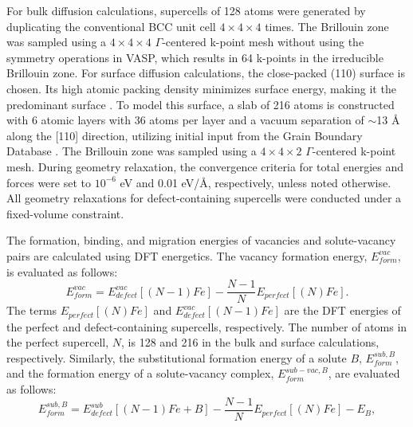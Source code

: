 \documentclass[preprint,12pt]{elsarticle}
\begin{document}
For bulk diffusion calculations, supercells of 128 atoms were generated by duplicating the conventional BCC unit cell $4\times4\times4$ times.  The Brillouin zone was sampled using a $4\times4\times4$ $\Gamma$-centered k-point mesh without using the symmetry operations in VASP, which results in 64 k-points in the irreducible Brillouin zone. 
For surface diffusion calculations, the close-packed (110) surface is chosen. Its high atomic packing density minimizes surface energy, making it the predominant surface \cite{tran2016surface}. To model this surface, a slab of 216 atoms is constructed with 6 atomic layers with 36 atoms per layer and a vacuum separation of $\sim$13 {\AA} along the [110] direction, utilizing initial input from the Grain Boundary Database \cite{tran2016surface, zheng_grain_2020}. The Brillouin zone was sampled using a $4\times4\times2$ $\Gamma$-centered k-point mesh. During geometry relaxation, the convergence criteria for total energies and forces were set to $10^{-6}$ eV and 0.01 eV/{\AA}, respectively, unless noted otherwise. All geometry relaxations for defect-containing supercells were conducted under a fixed-volume constraint.

The formation, binding, and migration energies of vacancies and solute-vacancy pairs are calculated using DFT energetics. The vacancy formation energy, $E_{form}^{vac}$, is evaluated as follows:
\begin{equation}
\label{eq_Ef_vac}
   E_{form}^{vac} = E^{vac}_{defect}[(N-1)Fe] - \frac{N-1}{N} E_{perfect}[(N) Fe] .
\end{equation}
The terms $E_{perfect}[(N) Fe]$ and $E^{vac}_{defect}[(N-1)Fe]$ are the DFT energies of the perfect and defect-containing supercells, respectively. The number of atoms in the perfect supercell, $N$, is 128 and 216 in the bulk and surface calculations, respectively. Similarly, the substitutional formation energy of a solute $B$, $E_{form}^{sub,B}$, and the formation energy of a solute-vacancy complex, $E_{form}^{sub-vac,B}$, are evaluated as follows:
\begin{equation}
\label{eq_Ef_sub}
    E_{form}^{sub,B} = E_{defect}^{sub}[(N-1)Fe + B] - \frac{N-1}{N}E_{perfect}[(N) Fe] - E_{B},
\end{equation}
\end{document}
